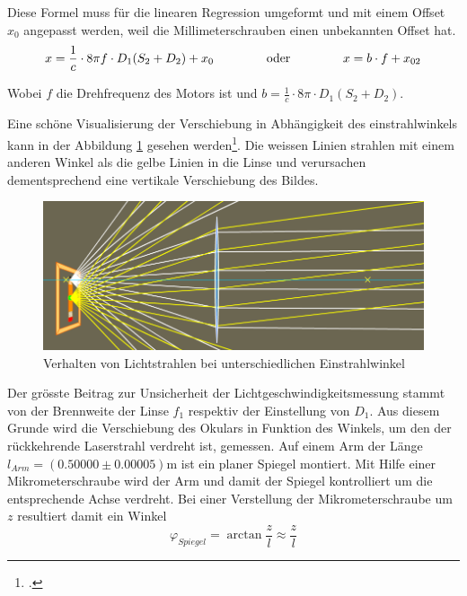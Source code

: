 Diese Formel muss f\"ur die linearen Regression umgeformt und mit  einem  Offset
$x_0$  angepasst  werden, weil die Millimeterschrauben einen unbekannten  Offset
hat.
\begin{equation}
    x = \frac{1}{c} \cdot 8\pi f \cdot D_1(S_2 + D_2) + x_0 \hspace{15mm}\textrm{oder}\hspace{15mm} x = b \cdot f + x_{02}
    \label{eq:lichtgeschwindigkeit}
\end{equation}

Wobei $f$ die Drehfrequenz des Motors ist und $b = \frac{1}{c} \cdot 8\pi\cdot D_1(S_2+D_2)$.

Eine   sch\"one   Visualisierung   der   Verschiebung   in   Abh\"angigkeit  des
einstrahlwinkels  kann  in  der   Abbildung  \ref{fig:lense-simulation}  gesehen
werden\footcite{ref:linsen-simulation}. Die  weissen  Linien  strahlen mit einem
anderen Winkel als die gelbe Linien in die Linse und verursachen dementsprechend
eine vertikale Verschiebung des Bildes.

\begin{figure}[H]
    \center
    \includegraphics[width=.8\textwidth]{images/lense-simulation.png}
    \caption{Verhalten von Lichtstrahlen bei unterschiedlichen Einstrahlwinkel}
    \label{fig:lense-simulation}
\end{figure}

Der gr\"osste Beitrag zur Unsicherheit der  Lichtgeschwindigkeitsmessung  stammt
von  der Brennweite der Linse $f_1$ respektiv der  Einstellung  von  $D_1$.  Aus
diesem Grunde wird die  Verschiebung des Okulars in Funktion des Winkels, um den
der r\"uckkehrende Laserstrahl verdreht ist, gemessen. Auf einem Arm der L\"ange
$l_{Arm} = (0.50000\pm0.00005)\textrm{m}$ ist ein planer Spiegel  montiert.  Mit
Hilfe einer Mikrometerschraube wird der  Arm  und damit der Spiegel kontrolliert
um   die   entsprechende   Achse   verdreht.   Bei   einer    Verstellung    der
Mikrometerschraube um $z$ resultiert damit ein Winkel
\begin{equation}
    \varphi_{Spiegel} = \arctan{\frac{z}{l}} \approx \frac{z}{l}
\end{equation}

